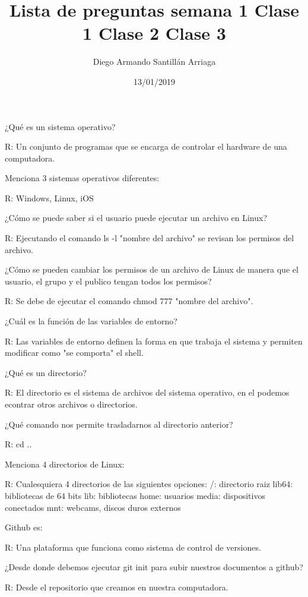 \documentclass[letter paper, 12pt, oneside]{article}
\title{\Huge Lista de preguntas semana 1}
\author{Diego Armando Santillán Arriaga}
\date{13/01/2019}
\begin{document}
	\maketitle
\newpage
\title{\huge\textbf{ Clase 1}}


¿Qué es un sistema operativo?


R: Un conjunto de programas que se encarga de controlar el hardware de una computadora.


Menciona 3 sistemas operativos diferentes:


R: Windows, Linux, iOS


¿Cómo se puede saber si el usuario puede ejecutar un archivo en Linux?


R: Ejecutando el comando ls -l "nombre del archivo" se revisan los permisos del archivo.


¿Cómo se pueden cambiar los permisos de un archivo de Linux de manera que el usuario, el grupo y el publico tengan todos los permisos?


R: Se debe de ejecutar el comando chmod 777 "nombre del archivo".


¿Cuál es la función de las variables de entorno?


R: Las variables de entorno definen la forma en que trabaja el sistema y permiten modificar como "se comporta" el shell.


\title{\huge\textbf{ Clase 2}}


¿Qué es un directorio?


R: El directorio es el sistema de archivos del sistema operativo, en el podemos econtrar otros archivos o directorios.


¿Qué comando nos permite trasladarnos al directorio anterior?


R: cd ..


Menciona 4 directorios de Linux:


R: Cualesquiera 4 directorios de las siguientes opciones:
/: directorio raiz
lib64: bibliotecas de 64 bits
lib: bibliotecas
home: usuarios
media: dispositivos conectados
mnt: webcams, discos duros externos



Github es:


R: Una plataforma que funciona como sistema de control de versiones.


\title{\huge\textbf{ Clase 3}}


¿Desde donde debemos ejecutar git init para subir nuestros documentos a github?


R: Desde el repositorio que creamos en nuestra computadora.
\end{document}
